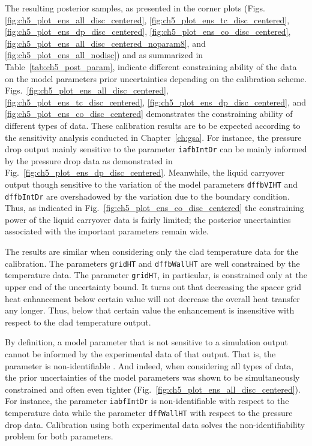The resulting posterior samples, as presented in the corner plots (Figs.\ref{fig:ch5_plot_ens_all_disc_centered}, \ref{fig:ch5_plot_ens_tc_disc_centered}, \ref{fig:ch5_plot_ens_dp_disc_centered}, \ref{fig:ch5_plot_ens_co_disc_centered}, \ref{fig:ch5_plot_ens_all_disc_centered_noparam8}, and \ref{fig:ch5_plot_ens_all_nodisc}) and as summarized in Table~\ref{tab:ch5_post_param}, indicate different constraining ability of the data on the model parameters prior uncertainties depending on the calibration scheme.
Figs.~\ref{fig:ch5_plot_ens_all_disc_centered}, \ref{fig:ch5_plot_ens_tc_disc_centered}, \ref{fig:ch5_plot_ens_dp_disc_centered}, and \ref{fig:ch5_plot_ens_co_disc_centered} demonstrates the constraining ability of different types of data.
These calibration results are to be expected according to the sensitivity analysis conducted in Chapter~\ref{ch:gsa}.
For instance, the pressure drop output mainly sensitive to the parameter \texttt{iafbIntDr} can be mainly informed by the pressure drop data as demonstrated in Fig.~\ref{fig:ch5_plot_ens_dp_disc_centered}.
Meanwhile, the liquid carryover output though sensitive to the variation of the model parameters \texttt{dffbVIHT} and \texttt{dffbIntDr} are overshadowed by the variation due to the boundary condition.
Thus, as indicated in Fig.~\ref{fig:ch5_plot_ens_co_disc_centered} the constraining power of the liquid carryover data is fairly limited; the posterior uncertainties associated with the important parameters remain wide.

The results are similar when considering only the clad temperature data for the calibration.
The parameters \texttt{gridHT} and \texttt{dffbWallHT} are well constrained by the temperature data.
The parameter \texttt{gridHT}, in particular, is constrained only at the upper end of the uncertainty bound.
It turns out that decreasing the spacer grid heat enhancement below certain value will not decrease the overall heat transfer any longer.
Thus, below that certain value the enhancement is insensitive with respect to the clad temperature output.

By definition, a model parameter that is not sensitive to a simulation output cannot be informed by the experimental data of that output. 
That is, the parameter is non-identifiable \cite{Hines2014}.
And indeed, when considering all types of data, the prior uncertainties of the model parameters was shown to be simultaneously constrained and often even tighter (Fig.~\ref{fig:ch5_plot_ens_all_disc_centered}).
For instance, the parameter \texttt{iabfIntDr} is non-identifiable with respect to the temperature data while the parameter \texttt{dffWallHT} with respect to the pressure drop data.
Calibration using both experimental data solves the non-identifiability problem for both parameters.


